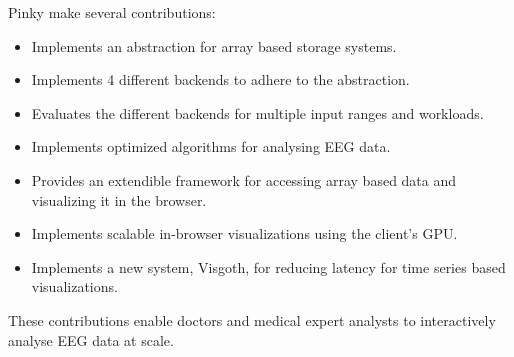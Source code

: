 Pinky make several contributions:

\begin{itemize}
  \item Implements an abstraction for array based storage systems.
  \item Implements 4 different backends to adhere to the abstraction.
  \item Evaluates the different backends for multiple input ranges and workloads.
  \item Implements optimized algorithms for analysing EEG data.
  \item Provides an extendible framework for accessing array based data and visualizing it in the browser.
  \item Implements scalable in-browser visualizations using the client's GPU.
  \item Implements a new system, Visgoth, for reducing latency for time series based visualizations.
\end{itemize}

These contributions enable doctors and medical expert analysts to interactively
analyse EEG data at scale.

